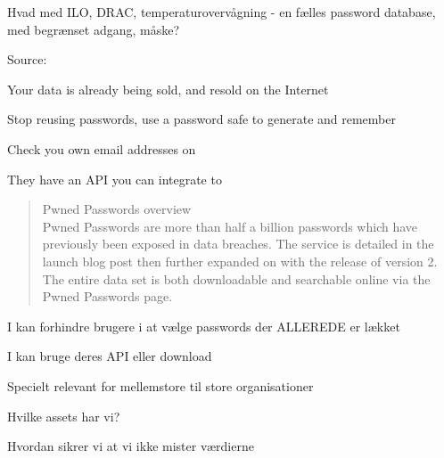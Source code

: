 \documentclass[Screen16to9,17pt]{foils}
\begin{document}
\vskip 1cm
Hvad med ILO, DRAC, temperaturovervågning - en fælles password database, med begrænset adgang, måske?




Source:




\begin{list1}
\item Your data is already being sold, and resold on the Internet
\item Stop reusing passwords, use a password safe to generate and remember
\item Check you own email addresses on 
\end{list1}

\centerline{They have an API you can integrate to}



\begin{quote}
Pwned Passwords overview\\
Pwned Passwords are more than half a billion passwords which have previously been exposed in data breaches. The service is detailed in the launch blog post then further expanded on with the release of version 2. The entire data set is both downloadable and searchable online via the Pwned Passwords page.
\end{quote}

\begin{list1}
\item I kan forhindre brugere i at vælge passwords der ALLEREDE er lækket
\item I kan bruge deres API eller download\\
{\footnotesize{}}
\end{list1}




\begin{list2}
\item Specielt relevant for mellemstore til store organisationer
\item Hvilke assets har vi?
\item Hvordan sikrer vi at vi ikke mister værdierne
\end{list2}
\end{document}
